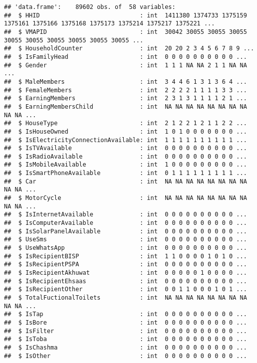 \documentclass[
]{article}
\begin{document}
\begin{verbatim}
## 'data.frame':    89602 obs. of  58 variables:
##  $ HHID                            : int  1411380 1374733 1375159 1375161 1375166 1375168 1375173 1375214 1375217 1375221 ...
##  $ VMAPID                          : int  30042 30055 30055 30055 30055 30055 30055 30055 30055 30055 ...
##  $ HouseholdCounter                : int  20 20 2 3 4 5 6 7 8 9 ...
##  $ IsFamilyHead                    : int  0 0 0 0 0 0 0 0 0 0 ...
##  $ Gender                          : int  1 1 1 NA NA 2 1 1 NA NA ...
##  $ MaleMembers                     : int  3 4 4 6 1 3 1 3 6 4 ...
##  $ FemaleMembers                   : int  2 2 2 2 1 1 1 1 3 3 ...
##  $ EarningMembers                  : int  2 3 1 3 1 1 1 1 2 1 ...
##  $ EarningMembersChild             : int  NA NA NA NA NA NA NA NA NA NA ...
##  $ HouseType                       : int  2 1 2 2 1 2 1 1 2 2 ...
##  $ IsHouseOwned                    : int  1 0 1 0 0 0 0 0 0 0 ...
##  $ IsElectricityConnectionAvailable: int  1 1 1 1 1 1 1 1 1 1 ...
##  $ IsTVAvailable                   : int  0 0 0 0 0 0 0 0 0 0 ...
##  $ IsRadioAvailable                : int  0 0 0 0 0 0 0 0 0 0 ...
##  $ IsMobileAvailable               : int  1 0 0 0 0 0 0 0 0 0 ...
##  $ IsSmartPhoneAvailable           : int  0 1 1 1 1 1 1 1 1 1 ...
##  $ Car                             : int  NA NA NA NA NA NA NA NA NA NA ...
##  $ MotorCycle                      : int  NA NA NA NA NA NA NA NA NA NA ...
##  $ IsInternetAvailable             : int  0 0 0 0 0 0 0 0 0 0 ...
##  $ IsComputerAvailable             : int  0 0 0 0 0 0 0 0 0 0 ...
##  $ IsSolarPanelAvailable           : int  0 0 0 0 0 0 0 0 0 0 ...
##  $ UseSms                          : int  0 0 0 0 0 0 0 0 0 0 ...
##  $ UseWhatsApp                     : int  0 0 0 0 0 0 0 0 0 0 ...
##  $ IsRecipientBISP                 : int  1 1 0 0 0 0 1 0 1 0 ...
##  $ IsRecipientPSPA                 : int  0 0 0 0 0 0 0 0 0 0 ...
##  $ IsRecipientAkhuwat              : int  0 0 0 0 0 1 0 0 0 0 ...
##  $ IsRecipientEhsaas               : int  0 0 0 0 0 0 0 0 0 0 ...
##  $ IsRecipientOther                : int  0 0 1 1 0 0 0 1 0 1 ...
##  $ TotalFuctionalToilets           : int  NA NA NA NA NA NA NA NA NA NA ...
##  $ IsTap                           : int  0 0 0 0 0 0 0 0 0 0 ...
##  $ IsBore                          : int  0 0 0 0 0 0 0 0 0 0 ...
##  $ IsFilter                        : int  0 0 0 0 0 0 0 0 0 0 ...
##  $ IsToba                          : int  0 0 0 0 0 0 0 0 0 0 ...
##  $ IsChashma                       : int  0 0 0 0 0 0 0 0 0 0 ...
##  $ IsOther                         : int  0 0 0 0 0 0 0 0 0 0 ...

\end{verbatim}
\end{document}
